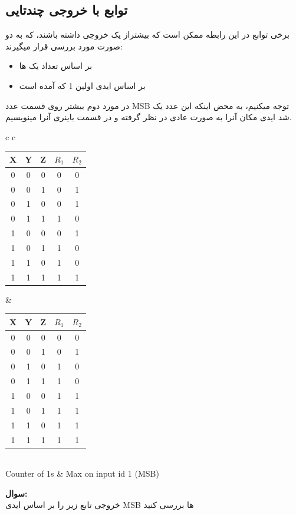 \documentclass[20pt, a4paper]{article}
\begin{document}
\subsection{توابع با خروجی چندتایی}
برخی توابع در این رابطه ممکن است که بیشتراز
یک خروجی داشته باشند، که به دو صورت مورد بررسی قرار میگیرند:
\begin{itemize}
	\item بر اساس تعداد یک ها 
	\item بر اساس ایدی اولین 1 که آمده است
\end{itemize}
در مورد دوم بیشتر روی قسمت عدد MSB 
توجه میکنیم، به محض اینکه این عدد یک شد ایدی مکان آنرا به صورت عادی در نظر گرفته و در قسمت باینری آنرا مینویسیم.


\begin{LTR}
	\begin{tabular}{ c c }
		\begin{tabular}{ c c c | c | c}
			X & Y & Z & $R_{1}$ & $R_{2}$ \\
			\hline
			0 & 0 & 0 & 0 & 0\\
			0 & 0 & 1 & 0 & 1\\
			0 & 1 & 0 & 0 & 1\\
			0 & 1 & 1 & 1 & 0\\
			1 & 0 & 0 & 0 & 1\\
			1 & 0 & 1 & 1 & 0\\
			1 & 1 & 0 & 1 & 0\\
			1 & 1 & 1 & 1 & 1
		\end{tabular}& 
		\begin{tabular}{ c c c | c | c}
			X & Y & Z & $R_{1}$ & $R_{2}$ \\
			\hline
			0 & 0 & 0 & 0 & 0\\
			0 & 0 & 1 & 0 & 1\\
			0 & 1 & 0 & 1 & 0\\
			0 & 1 & 1 & 1 & 0\\
			1 & 0 & 0 & 1 & 1\\
			1 & 0 & 1 & 1 & 1\\
			1 & 1 & 0 & 1 & 1\\
			1 & 1 & 1 & 1 & 1
		\end{tabular}\\
		\hline
		Counter of 1s  & Max on input id 1 (MSB)
	\end{tabular}
\end{LTR}

\textbf{سوال:}\\
خروجی تابع زیر را بر اساس ایدی
MSB 
ها بررسی کنید
\end{document}
